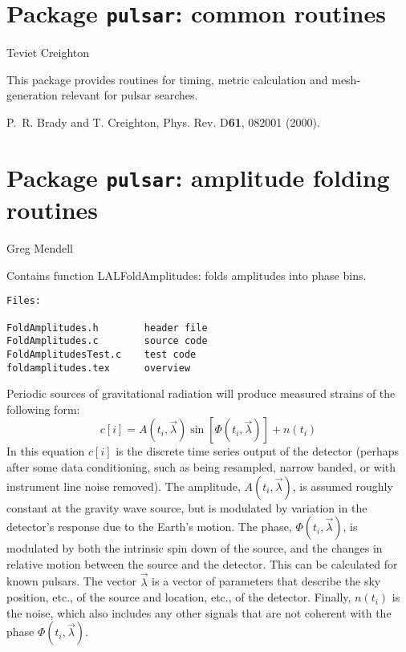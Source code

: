 \chapter{Package \texttt{pulsar}: common routines}
Teviet Creighton
\bigskip

This package provides routines for timing, metric calculation and
mesh-generation relevant for pulsar searches.

\newpage
\newpage
\newpage
\newpage
\newpage
\newpage
\newpage
\newpage

\newpage\begin{thebibliography}{0}
  P.~R. Brady and T. Creighton, Phys. Rev. D\textbf{61}, 082001
  (2000).
\end{thebibliography}

\chapter{Package \texttt{pulsar}: amplitude folding routines}
Greg Mendell
\bigskip

Contains function LALFoldAmplitudes: folds amplitudes into phase bins.

\begin{verbatim}
Files:

FoldAmplitudes.h        header file
FoldAmplitudes.c        source code
FoldAmplitudesTest.c    test code
foldamplitudes.tex      overview
\end{verbatim}

Periodic sources of gravitational radiation will produce measured strains of the following form:
$$
c[i] = A(t_i,\vec{\lambda}) \sin[\Phi(t_i,\vec{\lambda})] + n(t_i)
$$
In this equation $c[i]$ is the discrete time series output of the detector (perhaps after some data conditioning, such as
being resampled, narrow banded, or with instrument line noise removed).
The amplitude, $A(t_i,\vec{\lambda})$, is assumed roughly constant at the gravity wave source,
but is modulated by variation in the detector's response due to the Earth's motion.  The phase, $\Phi(t_i,\vec{\lambda})$,
is modulated by both the intrinsic spin down of the source, and the changes in relative motion between the source
and the detector.  This can be calculated for known pulsars.  The vector $\vec{\lambda}$ is a vector of parameters
that describe the sky position, etc., of the source and location, etc., of the detector.
Finally, $n(t_i)$ is the noise, which also includes any other signals that are not coherent with
the phase $\Phi(t_i,\vec{\lambda})$.


